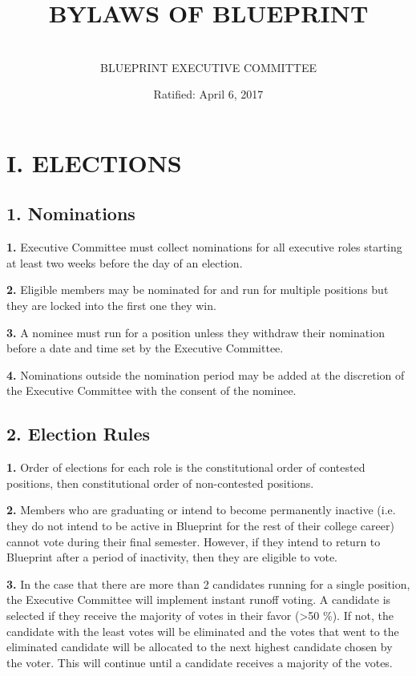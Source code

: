 \documentclass{article}
\title{BYLAWS OF BLUEPRINT}
\author{\\ \sc BLUEPRINT EXECUTIVE COMMITTEE}
\date{Ratified: April 6, 2017}
\begin{document}
\maketitle

\section{I. ELECTIONS}

\subsection{1. Nominations}
\textbf{1.} Executive Committee must collect nominations for all executive roles starting at least two weeks before the day of an election. 

\textbf{2.} Eligible members may be nominated for and run for multiple positions but they are locked into the first one they win. 

\textbf{3.} A nominee must run for a position unless they withdraw their nomination before a date and time set by the Executive Committee. 

\textbf{4.} Nominations outside the nomination period may be added at the discretion of the Executive Committee with the consent of the nominee.

\subsection{2. Election Rules}

\textbf{1.} Order of elections for each role is the constitutional order of contested positions, then constitutional order of non-contested positions.

\textbf{2.} Members who are graduating or intend to become permanently inactive (i.e. they do not intend to be active in Blueprint for the rest of their college career) cannot vote during their final semester. However, if they intend to return to Blueprint after a period of inactivity, then they are eligible to vote.

\textbf{3.} In the case that there are more than 2 candidates running for a single position, the Executive Committee will implement instant runoff voting. A candidate is selected if they receive the majority of votes in their favor (\textgreater 50 \%). If not, the candidate with the least votes will be eliminated and the votes that went to the eliminated candidate will be allocated to the next highest candidate chosen by the voter. This will continue until a candidate receives a majority of the votes.
\end{document}
